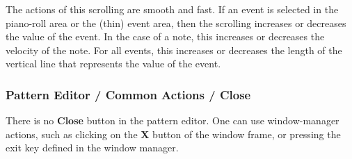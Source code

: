    The actions of this scrolling are smooth and fast.
   If an event is selected in the piano-roll area or the (thin) event area,
   then the scrolling increases or decreases the value of the event.
   In the case of a note, this increases or decreases the velocity of the note.
   For all events, this increases or decreases the length of the vertical line
   that represents the value of the event.

\subsubsection{Pattern Editor / Common Actions / Close}
\label{subsec:pattern_editor_close}

   There is no \textbf{Close} button in the pattern editor.  One can use
   window-manager actions, such as clicking on the \textbf{X}
   button of the window
   frame, or pressing the exit key defined in the window manager.

